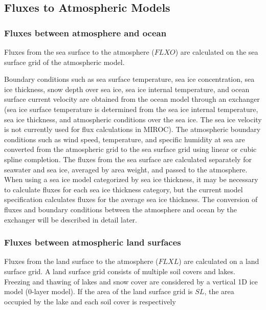 \hypertarget{fluxes-to-atmospheric-models}{%
\subsection{Fluxes to Atmospheric
Models}\label{fluxes-to-atmospheric-models}}

\hypertarget{fluxes-between-atmosphere-and-ocean}{%
\subsubsection{Fluxes between atmosphere and
ocean}\label{fluxes-between-atmosphere-and-ocean}}

Fluxes from the sea surface to the atmosphere (\(FLXO\)) are calculated
on the sea surface grid of the atmospheric model.

Boundary conditions such as sea surface temperature, sea ice
concentration, sea ice thickness, snow depth over sea ice, sea ice
internal temperature, and ocean surface current velocity are obtained
from the ocean model through an exchanger (sea ice surface temperature
is determined from the sea ice internal temperature, sea ice thickness,
and atmospheric conditions over the sea ice. The sea ice velocity is not
currently used for flux calculations in MIROC). The atmospheric boundary
conditions such as wind speed, temperature, and specific humidity at sea
are converted from the atmospheric grid to the sea surface grid using
linear or cubic spline completion. The fluxes from the sea surface are
calculated separately for seawater and sea ice, averaged by area weight,
and passed to the atmosphere. When using a sea ice model categorized by
sea ice thickness, it may be necessary to calculate fluxes for each sea
ice thickness category, but the current model specification calculates
fluxes for the average sea ice thickness. The conversion of fluxes and
boundary conditions between the atmosphere and ocean by the exchanger
will be described in detail later.

\hypertarget{fluxes-between-atmospheric-land-surfaces}{%
\subsubsection{Fluxes between atmospheric land
surfaces}\label{fluxes-between-atmospheric-land-surfaces}}

Fluxes from the land surface to the atmosphere (\(FLXL\)) are calculated
on a land surface grid. A land surface grid consists of multiple soil
covers and lakes. Freezing and thawing of lakes and snow cover are
considered by a vertical 1D ice model (0-layer model). If the area of
the land surface grid is \(SL\), the area occupied by the lake and each
soil cover is respectively

